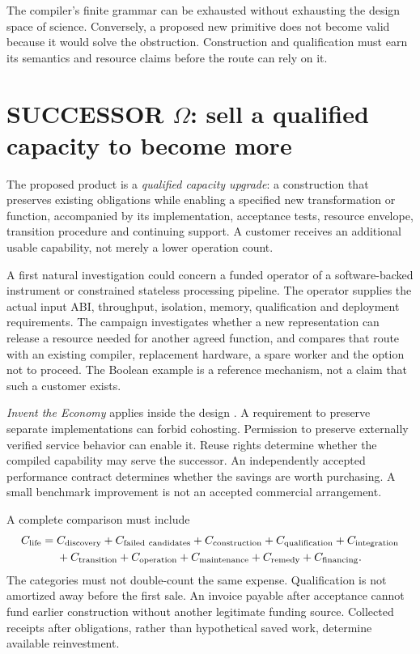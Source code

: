 \documentclass[11pt,letterpaper]{article}
\theoremstyle{definition}\newtheorem{definition}[theorem]{Definition}
\theoremstyle{remark}\newtheorem{remark}[theorem]{Remark}
\begin{document}
The compiler's finite grammar can be exhausted without exhausting the design space of science. Conversely, a proposed new primitive does not become valid because it would solve the obstruction. Construction and qualification must earn its semantics and resource claims before the route can rely on it.

\section{SUCCESSOR \texorpdfstring{$\Omega$}{Omega}: sell a qualified capacity to become more}
\label{sec:business}
The proposed product is a \emph{qualified capacity upgrade}: a construction that preserves existing obligations while enabling a specified new transformation or function, accompanied by its implementation, acceptance tests, resource envelope, transition procedure and continuing support. A customer receives an additional usable capability, not merely a lower operation count.

A first natural investigation could concern a funded operator of a software-backed instrument or constrained stateless processing pipeline. The operator supplies the actual input ABI, throughput, isolation, memory, qualification and deployment requirements. The campaign investigates whether a new representation can release a resource needed for another agreed function, and compares that route with an existing compiler, replacement hardware, a spare worker and the option not to proceed. The Boolean example is a reference mechanism, not a claim that such a customer exists.

\emph{Invent the Economy} applies inside the design \citep{economy}. A requirement to preserve separate implementations can forbid cohosting. Permission to preserve externally verified service behavior can enable it. Reuse rights determine whether the compiled capability may serve the successor. An independently accepted performance contract determines whether the savings are worth purchasing. A small benchmark improvement is not an accepted commercial arrangement.

A complete comparison must include
\begin{equation}
 \begin{aligned}
 C_{\rm life}={}&C_{\rm discovery}+C_{\rm failed\ candidates}+C_{\rm construction}
 +C_{\rm qualification}+C_{\rm integration}\\
 &+C_{\rm transition}+C_{\rm operation}+C_{\rm maintenance}
 +C_{\rm remedy}+C_{\rm financing}.
 \end{aligned}
 \label{eq:cost}
\end{equation}
The categories must not double-count the same expense. Qualification is not amortized away before the first sale. An invoice payable after acceptance cannot fund earlier construction without another legitimate funding source. Collected receipts after obligations, rather than hypothetical saved work, determine available reinvestment.
\end{document}

